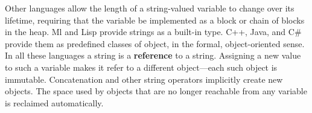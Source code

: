 \vskip 6pt
Other languages allow the length of a string-valued variable to change over its lifetime, requiring that the variable be implemented as a block or chain of blocks in the heap. Ml and Lisp provide strings as a built-in type. C++, Java, and C$\#$ provide them as predefined classes of object, in the formal, object-oriented sense. In all these languages a string is a {\bf reference} to a string. Assigning a new value to such a variable makes it refer to a different object---each such object is immutable. Concatenation and other string operators implicitly create new objects. The space used by objects that are no longer reachable from any variable is reclaimed automatically.

\vfill\eject
\bye
